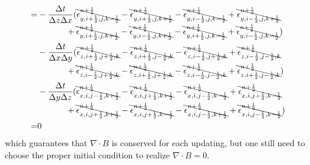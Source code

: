 \documentclass[a4paper,10pt]{article}
\begin{document}
\begin{align}
=&-\frac{\Delta t}{\Delta z\Delta x}(\bcancel{\epsilon_{y,i+\frac{1}{2},j,k-\frac{1}{2}}^{n+\frac{1}{2}}}-\bcancel{\epsilon_{y,i+\frac{1}{2},j,k+\frac{1}{2}}^{n+\frac{1}{2}}}-\bcancel{\epsilon_{y,i-\frac{1}{2},j,k-\frac{1}{2}}^{n+\frac{1}{2}}}+\bcancel{\epsilon_{y,i-\frac{1}{2},j,k+\frac{1}{2}}^{n+\frac{1}{2}}} \notag \\
&\quad\quad\quad\ +\bcancel{\epsilon_{y,i+\frac{1}{2},j,k+\frac{1}{2}}^{n+\frac{1}{2}}}-\bcancel{\epsilon_{y,i-\frac{1}{2},j,k+\frac{1}{2}}^{n+\frac{1}{2}}}-\bcancel{\epsilon_{y,i+\frac{1}{2},j,k-\frac{1}{2}}^{n+\frac{1}{2}}}+\bcancel{\epsilon_{y,i-\frac{1}{2},j,k-\frac{1}{2}}^{n+\frac{1}{2}}}) \notag \\
&-\frac{\Delta t}{\Delta x\Delta y}(\bcancel{\epsilon_{z,i+\frac{1}{2},j+\frac{1}{2},k}^{n+\frac{1}{2}}}-\bcancel{\epsilon_{z,i+\frac{1}{2},j-\frac{1}{2},k}^{n+\frac{1}{2}}}-\bcancel{\epsilon_{z,i-\frac{1}{2},j+\frac{1}{2},k}^{n+\frac{1}{2}}}+\bcancel{\epsilon_{z,i-\frac{1}{2},j-\frac{1}{2},k}^{n+\frac{1}{2}}} \notag \\
&\quad\quad\quad\ +\bcancel{\epsilon_{z,i-\frac{1}{2},j+\frac{1}{2},k}^{n+\frac{1}{2}}}-\bcancel{\epsilon_{z,i+\frac{1}{2},j+\frac{1}{2},k}^{n+\frac{1}{2}}}-\bcancel{\epsilon_{z,i-\frac{1}{2},j-\frac{1}{2},k}^{n+\frac{1}{2}}}+\bcancel{\epsilon_{z,i+\frac{1}{2},j-\frac{1}{2},k}^{n+\frac{1}{2}}}) \notag \\
&-\frac{\Delta t}{\Delta y\Delta z}(\bcancel{\epsilon_{x,i,j-\frac{1}{2},k+\frac{1}{2}}^{n+\frac{1}{2}}}-\bcancel{\epsilon_{x,i,j+\frac{1}{2},k+\frac{1}{2}}^{n+\frac{1}{2}}}-\bcancel{\epsilon_{x,i,j-\frac{1}{2},k-\frac{1}{2}}^{n+\frac{1}{2}}}+\bcancel{\epsilon_{x,i,j+\frac{1}{2},k-\frac{1}{2}}^{n+\frac{1}{2}}} \notag \\
&\quad\quad\quad\ +\bcancel{\epsilon_{x,i,j+\frac{1}{2},k+\frac{1}{2}}^{n+\frac{1}{2}}}-\bcancel{\epsilon_{x,i,j+\frac{1}{2},k-\frac{1}{2}}^{n+\frac{1}{2}}}-\bcancel{\epsilon_{x,i,j-\frac{1}{2},k+\frac{1}{2}}^{n+\frac{1}{2}}}+\bcancel{\epsilon_{x,i,j-\frac{1}{2},k-\frac{1}{2}}^{n+\frac{1}{2}}}) \\
=&0 \notag 
\end{align}
which guarantees that $\nabla\cdot B$ is conserved for each updating, but one still need to choose the proper initial condition to realize  $\nabla\cdot B=0$.
\end{document}
